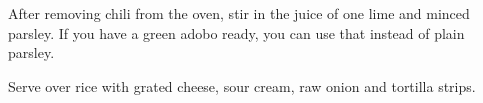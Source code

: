 \begin{recipe}

After removing chili from the oven, stir in the juice of one lime and minced parsley. If you have a green adobo ready, you can use that instead of plain parsley.


Serve over rice with grated cheese, sour cream, raw onion and tortilla strips.

\end{recipe}
